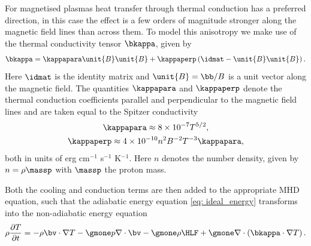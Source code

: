 For magnetised plasmas heat transfer through thermal conduction has a preferred direction, in this case the effect is a few orders of magnitude stronger along the magnetic field lines than across them. To model this anisotropy we make use of the thermal conductivity tensor $\bkappa$, given by
\begin{equation} \label{eq: conduction}
  \bkappa = \kappapara\unit{B}\unit{B} + \kappaperp\left(\idmat - \unit{B}\unit{B}\right).
\end{equation}
Here $\idmat$ is the identity matrix and $\unit{B} = \bb/B$ is a unit vector along the magnetic field. The quantities $\kappapara$ and $\kappaperp$ denote the thermal conduction coefficients parallel and perpendicular to the magnetic field lines and are taken equal to the Spitzer conductivity \citep{book_priest}
\begin{equation} \label{eq: thermal_coeffs}
  \begin{gathered}
    \kappapara \approx 8 \times 10^{-7} T^{5/2}, \\
    \kappaperp \approx 4 \times 10^{-10} n^2 B^{-2} T^{-3} \kappapara,
  \end{gathered}
\end{equation}
both in units of erg cm$^{-1}$ s$^{-1}$ K$^{-1}$. Here $n$ denotes the number density, given by $n = \rho \massp$ with $\massp$ the proton mass.

Both the cooling and conduction terms are then added to the appropriate MHD equation, such that the adiabatic energy equation \eqref{eq: ideal_energy} transforms into the non-adiabatic energy equation
\begin{equation} \label{eq: nonad_energy}
  \rho \frac{\partial T}{\partial t} =
    -\rho \bv \cdot \nabla T
    -\gmone p \nabla \cdot \bv
    -\gmone \rho \HLF
    +\gmone \nabla \cdot \left(\bkappa \cdot \nabla T\right).
\end{equation}


